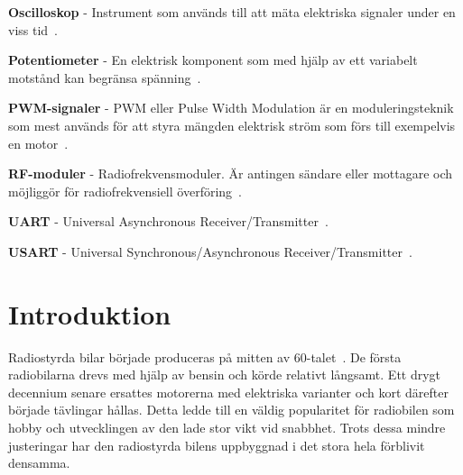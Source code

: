 \documentclass[a4paper]{article}
\begin{document}
\vspace{5mm} \noindent
{\bf Oscilloskop} - Instrument som används till att mäta elektriska signaler under en viss tid~\cite{oscilloscope}.

\vspace{5mm} \noindent
{\bf Potentiometer} - En elektrisk komponent som med hjälp av ett variabelt motstånd kan begränsa spänning~\cite{Potentiometer}.


\vspace{5mm} \noindent
{\bf PWM-signaler} - PWM eller Pulse Width Modulation är en moduleringsteknik som mest används för att styra mängden elektrisk ström som förs till exempelvis en motor~\cite{PWM}.

\vspace{5mm} \noindent
{\bf RF-moduler} - Radiofrekvensmoduler. Är antingen sändare eller mottagare och möjliggör för radiofrekvensiell överföring~\cite{RFModule}.

\vspace{5mm} \noindent
{\bf UART} - Universal Asynchronous Receiver/Transmitter~\cite{chalmersARM}.

\vspace{5mm} \noindent
{\bf USART} - Universal Synchronous/Asynchronous Receiver/Transmitter~\cite{chalmersARM}.





\newpage
\section{Introduktion}


Radiostyrda bilar började produceras på mitten av 60-talet~\cite{RCHistory}. De första radiobilarna drevs med hjälp av bensin och körde relativt långsamt. Ett drygt decennium senare ersattes motorerna med elektriska varianter och kort därefter började tävlingar hållas. Detta ledde till en väldig popularitet för radiobilen som hobby och utvecklingen av den lade stor vikt vid snabbhet. Trots dessa mindre justeringar har den radiostyrda bilens uppbyggnad i det stora hela förblivit densamma.
\end{document}
